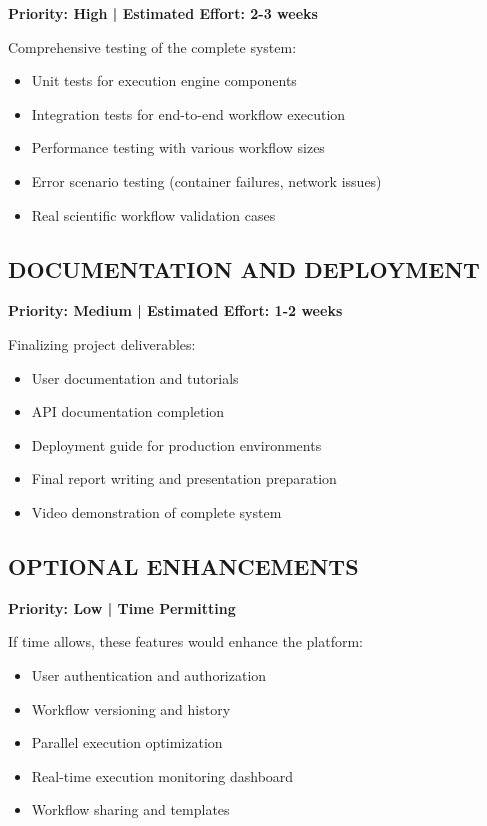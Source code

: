 \documentclass[12pt]{article}
\begin{document}
\hspace{\parindent}\textbf{Priority: High | Estimated Effort: 2-3 weeks}

Comprehensive testing of the complete system:

\begin{itemize}
    \item Unit tests for execution engine components
    \item Integration tests for end-to-end workflow execution
    \item Performance testing with various workflow sizes
    \item Error scenario testing (container failures, network issues)
    \item Real scientific workflow validation cases
\end{itemize}

\subsection{DOCUMENTATION AND DEPLOYMENT}

\hspace{\parindent}\textbf{Priority: Medium | Estimated Effort: 1-2 weeks}

Finalizing project deliverables:

\begin{itemize}
    \item User documentation and tutorials
    \item API documentation completion
    \item Deployment guide for production environments
    \item Final report writing and presentation preparation
    \item Video demonstration of complete system
\end{itemize}

\subsection{OPTIONAL ENHANCEMENTS}

\hspace{\parindent}\textbf{Priority: Low | Time Permitting}

If time allows, these features would enhance the platform:

\begin{itemize}
    \item User authentication and authorization
    \item Workflow versioning and history
    \item Parallel execution optimization
    \item Real-time execution monitoring dashboard
    \item Workflow sharing and templates
\end{itemize}
\end{document}
